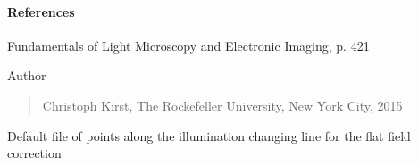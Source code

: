 \documentclass[letterpaper,10pt,english]{sphinxmanual}
\begin{document}
\paragraph{References}

Fundamentals of Light Microscopy and Electronic Imaging, p. 421

Author
\begin{quote}

Christoph Kirst, The Rockefeller University, New York City, 2015
\end{quote}

\begin{fulllineitems}
\label{api/ClearMap.ImageProcessing:ClearMap.ImageProcessing.IlluminationCorrection.DefaultFlatFieldLineFile}
Default file of points along the illumination changing line for the flat field correction




{\hyperref[api/ClearMap.ImageProcessing:ClearMap.ImageProcessing.IlluminationCorrection.correctIllumination]{\emph{}}}



\end{fulllineitems}

\end{document}
